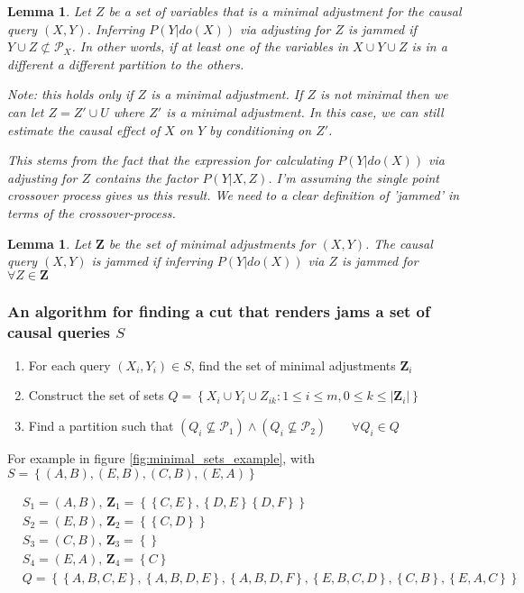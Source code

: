 \documentclass{article}
\newcommand{\set}[1]{\left\{#1\right\}}
\newcommand{\eq}[1]{\begin{align*}#1\end{align*}}
\newcommand{\pt}{\mathcal P}
\theoremstyle{plain}
\newtheorem{lemma}[theorem]{Lemma}
\theoremstyle{definition}
\begin{document}
\begin{lemma}Let $Z$ be a set of variables that is a minimal adjustment for the causal query $(X,Y)$. Inferring $P(Y|do(X))$ via adjusting for $Z$ is jammed if $Y \cup Z \not\subset \pt_X$. In other words, if at least one of the variables in $X \cup Y \cup Z$ is in a different a different partition to the others. 

Note: this holds only if $Z$ is a \textit{minimal} adjustment. If $Z$ is not minimal then we can let $Z = Z' \cup U$ where $Z'$ is a minimal adjustment. In this case, we can still estimate the causal effect of $X$ on $Y$ by conditioning on $Z'$. 

\color{red} This stems from the fact that the expression for calculating $P(Y|do(X))$ via adjusting for $Z$ contains the factor $P(Y|X,Z)$.  I'm assuming the single point crossover process gives us this result. We need to a clear definition of 'jammed' in terms of the crossover-process.
\end{lemma}

\begin{lemma} Let $\boldsymbol{Z}$ be the set of minimal adjustments for $(X,Y)$. The causal query $(X,Y)$ is jammed if inferring $P(Y|do(X))$ via $Z$ is jammed for $\forall Z \in \boldsymbol{Z}$ 
\end{lemma}


\subsubsection{An algorithm for finding a cut that renders jams a set of causal queries $S$}
\begin{enumerate}
\item For each query $(X_i,Y_i)\in S$, find the set of minimal adjustments $\boldsymbol{Z}_i$  
\item Construct the set of sets $Q = \set{X_i \cup Y_i \cup Z_{ik} : 1 \leq i \leq m, 0 \leq k \leq |\boldsymbol{Z}_i|}$
\item Find a partition such that $(Q_i \nsubseteq \pt_1)\land (Q_i \nsubseteq \pt_2)\qquad \forall Q_i \in Q$
\end{enumerate}

For example in figure \ref{fig:minimal_sets_example}, with $S = \set{(A,B),(E,B),(C,B),(E,A)}$

\eq{
&S_1 = (A,B),\, \boldsymbol{Z}_1 = \set{\set{C, E},\set{D,E} \set{D,F}} \\
&S_2 = (E,B),\, \boldsymbol{Z}_2 = \set{\set{C,D}} \\
&S_3 = (C,B),\, \boldsymbol{Z}_3 = \set{} \\
&S_4 = (E,A),\, \boldsymbol{Z}_4 = \set{C} \\
&Q = \set{\set{A,B,C,E},\set{A,B,D,E},\set{A,B,D,F},\set{E,B,C,D},\set{C,B},\set{E,A,C}}
}
\end{document}

